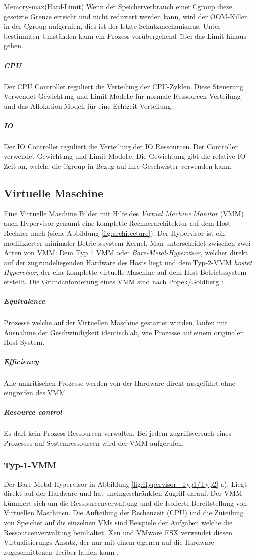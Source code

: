 Memory-max(Hard-Limit)
Wenn der Speicherverbrauch einer Cgroup diese gesetzte Grenze erreicht und nicht reduziert werden kann, wird der OOM-Killer in der Cgroup aufgerufen, dies ist der letzte Schutzmechanismus. Unter bestimmten Umständen kann ein Prozess vorübergehend über das Limit hinaus gehen.

\subparagraph{CPU}
Der CPU Controller reguliert die Verteilung der CPU-Zyklen. Diese Steuerung Verwendet Gewichtung und Limit Modelle für normale Ressourcen Verteilung und das Allokation Modell für eine Echtzeit Verteilung.
\subparagraph{IO}
Der IO Controller reguliert die Verteilung der IO Ressourcen. Der Controller verwendet Gewichtung und Limit Modelle. Die Gewichtung gibt die relative IO-Zeit an, welche die Cgroup in Bezug auf ihre Geschwister verwenden kann.

\pagebreak
\subsection{Virtuelle Maschine}
Eine Virtuelle Maschine Bildet mit Hilfe des \glqq{}\emph{Virtual Machine Monitor}\grqq{} (VMM) auch Hypervisor genannt eine komplette Rechnerarchitektur auf dem Host-Rechner nach (siehe Abbildung \ref{fig:architecture}). Der Hypervisor ist ein modifizierter minimaler Betriebssystem-Kernel. Man unterscheidet zwischen zwei Arten von VMM: Dem Typ 1 VMM oder \glqq{}\emph{Bare-Metal-Hypervisor}\grqq{}, welcher direkt auf der zugrundeliegenden Hardware des Hosts liegt und dem Typ-2-VMM \glqq{}\emph{hostet Hypervisor}\grqq{}, der eine komplette virtuelle Maschine auf dem Host Betriebssystem erstellt. Die Grundanforderung eines VMM sind nach Popek/Goldberg \cite{Popek1974FormalArchitectures,Glatz2015Betriebssysteme}:


 \subparagraph{Equivalence} 
 Prozesse welche auf der Virtuellen Maschine gestartet wurden, laufen mit Ausnahme der Geschwindigkeit identisch ab, wie Prozesse auf einem originalen Host-System.
 
\subparagraph{Efficiency} 
Alle unkritischen Prozesse werden von der Hardware direkt ausgeführt ohne eingreifen des VMM.

\subparagraph{Resource control} 
Es darf kein Prozess Ressourcen verwalten. Bei jedem zugriffsversuch eines Prozesses auf Systemressourcen wird der VMM aufgerufen.



\subsubsection{Typ-1-VMM}
Der Bare-Metal-Hypervisor in Abbildung \ref{fig:Hypervisor_Typ1/Typ2} a), Liegt direkt auf der Hardware und hat uneingeschränkten Zugriff darauf. Der VMM kümmert sich um die Ressourcenverwaltung und die Isolierte Bereitstellung von Virtuellen Maschinen. Die Aufteilung der Rechenzeit (CPU) und die Zuteilung von Speicher auf die einzelnen VMs sind Beispiele der Aufgaben welche die Ressourcenverwaltung beinhaltet. Xen \cite{Install2018XenArchitecture} und VMware ESX \cite{Go-to2018ESXi} verwendet diesen Virtualisierungs Ansatz, der nur mit einem eigenen auf die Hardware zugeschnittenen Treiber laufen kann \cite{Glatz2015Betriebssysteme}.

